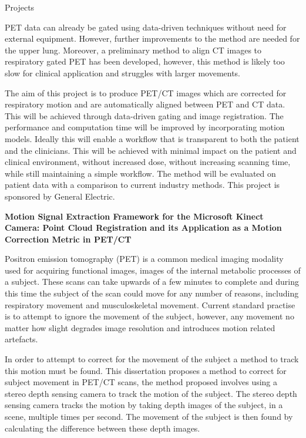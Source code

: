 \documentclass{cv}
\begin{document}
\begin{rSection}{Projects}
\item PET data can already be gated using data-driven techniques without need for external equipment. However, further improvements to the method are needed for the upper lung. Moreover, a preliminary method to align CT images to respiratory gated PET has been developed, however, this method is likely too slow for clinical application and struggles with larger movements.

\item The aim of this project is to produce PET/CT images which are corrected for respiratory motion and are automatically aligned between PET and CT data. This will be achieved through data-driven gating and image registration. The performance and computation time will be improved by incorporating motion models. Ideally this will enable a workflow that is transparent to both the patient and the clinicians. This will be achieved with minimal impact on the patient and clinical environment, without increased dose, without increasing scanning time, while still maintaining a simple workflow. The method will be evaluated on patient data with a comparison to current industry methods. This project is sponsored by General Electric.


{\bf Motion Signal Extraction Framework for the Microsoft Kinect Camera: Point Cloud Registration and its Application as a Motion Correction Metric in PET/CT} \hfill {\em} 

\item Positron emission tomography (PET) is a common medical imaging modality used for acquiring functional images, images of the internal metabolic processes of a subject. These scans can take upwards of a few minutes to complete and during this time the subject of the scan could move for any number of reasons, including respiratory movement and musculoskeletal movement. Current standard practise is to attempt to ignore the movement of the subject, however, any movement no matter how slight degrades image resolution and introduces motion related artefacts.

\item In order to attempt to correct for the movement of the subject a method to track this motion must be found. This dissertation proposes a method to correct for subject movement in PET/CT scans, the method proposed involves using a stereo depth sensing camera to track the motion of the subject. The stereo depth sensing camera tracks the motion by taking depth images of the subject, in a scene, multiple times per second. The movement of the subject is then found by calculating the difference between these depth images.


\end{rSection}
\end{document}
